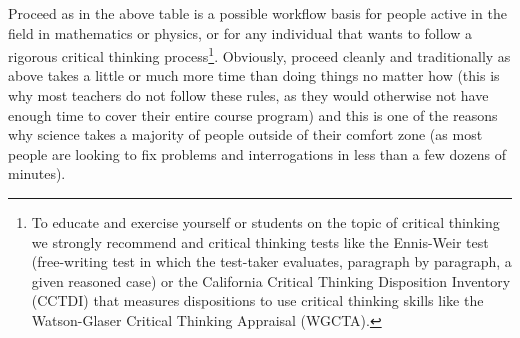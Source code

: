 	Proceed as in the above table is a possible workflow basis for people active in the field in mathematics or physics, or for any individual that wants to follow a rigorous critical thinking process\footnote{To educate and exercise yourself or students on the topic of critical thinking we strongly recommend \cite{parker2016looseleaf} and critical thinking tests like the Ennis-Weir test (free-writing test in which the test-taker evaluates, paragraph by paragraph, a given reasoned case) or the California Critical Thinking Disposition Inventory (CCTDI) that measures dispositions to use critical thinking skills like the Watson-Glaser Critical Thinking Appraisal (WGCTA).}. Obviously, proceed cleanly and traditionally as above takes a little or much more time than doing things no matter how (this is why most teachers do not follow these rules, as they would otherwise not have enough time to cover their entire course program) and this is one of the reasons why science takes a  majority of people outside of their comfort zone (as most people are looking to fix problems and interrogations in less than a few dozens of minutes).

